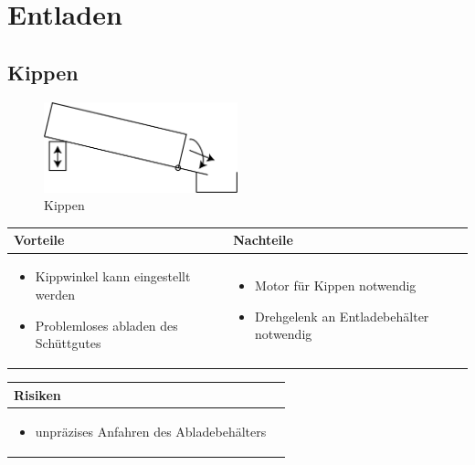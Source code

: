 
\section{Entladen}


\subsection{Kippen}
\begin{figure} [hbp]
	\centering
	\includegraphics[width=0.5\textwidth]{fig/Entladen_Kippen.png}
	\caption{Kippen}
\end{figure}

\begin{table}[h]
\begin{tabular}{p{} | p{}}


 \textbf{Vorteile} & \textbf{Nachteile} \\ \hline
	 
\begin{itemize}
\item Kippwinkel kann eingestellt werden
\item Problemloses abladen des Schüttgutes
\end{itemize}

 
 &
 
\begin{itemize}
\item Motor für Kippen notwendig
\item Drehgelenk an Entladebehälter notwendig
\end{itemize}

\end{tabular}
\end{table}

\begin{table}[h]
\begin{tabular}{p{}p{}}


 \textbf{Risiken} & \\ \hline
	 
\begin{itemize}
\item unpräzises Anfahren des Abladebehälters
\end{itemize}

 
\end{tabular}
\end{table}

